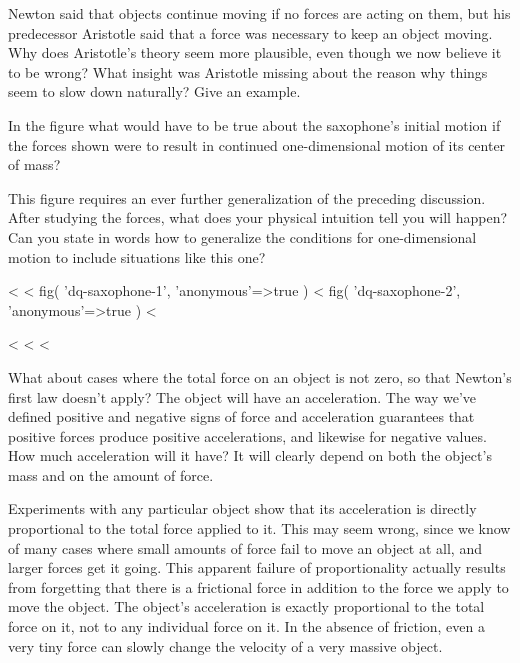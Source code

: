 \startdqs

\begin{dq}
Newton said that objects continue moving if no forces are
acting on them, but his predecessor Aristotle said that a
force was necessary to keep an object moving. Why does
Aristotle's theory seem more plausible, even though we now
believe it to be wrong? What insight was Aristotle missing
about the reason why things seem to slow down naturally?
Give an example.
\end{dq}

\begin{dq}\label{dq:saxophone-1}
In the figure what would have to be true about the
saxophone's initial motion if the forces shown were to
result in continued one-dimensional motion of its center of mass?
\end{dq}

\begin{dq}\label{dq:saxophone-2}
This figure requires an ever further generalization
of the preceding discussion. After studying the forces, what
does your physical intuition tell you will happen? Can you
state in words how to generalize the conditions for
one-dimensional motion to include situations like this one?
\end{dq}

<%
<%
  fig(
    'dq-saxophone-1',
    {'anonymous'=>true}
  )
\spacebetweenfigs
<%
  fig(
    'dq-saxophone-2',
    {'anonymous'=>true}
  )
<%

<%
<%
<%

What about cases where the total force on an object is not
zero, so that Newton's first law doesn't apply? The object
will have an acceleration. The way we've defined positive
and negative signs of force and acceleration guarantees that
positive forces produce positive accelerations, and likewise
for negative values. How much acceleration will it have? It
will clearly depend on both the object's mass and on
the amount of force.

Experiments with any particular object show that its
acceleration is directly proportional to the total force
applied to it. This may seem wrong, since we know of many
cases where small amounts of force fail to move an object at
all, and larger forces get it going. This apparent failure
of proportionality actually results from forgetting that
there is a frictional force in addition to the force we
apply to move the object. The object's acceleration is
exactly proportional to the total force on it, not to any
individual force on it. In the absence of friction, even a
very tiny force can slowly change the velocity of a
very massive object.

